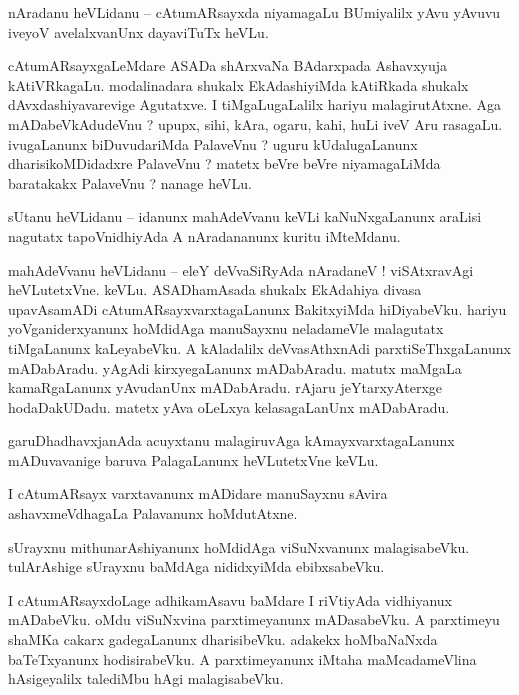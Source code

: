 \documentclass{article}
\begin{document}
\begin{mn}%
nAradanu heVLidanu -- cAtumARsayxda niyamagaLu BUmiyalilx yAvu yAvuvu iveyoV avelalxvanUnx 
dayaviTuTx heVLu.
\end{mn}

\begin{mn}%
cAtumARsayxgaLeMdare ASADa shArxvaNa BAdarxpada Ashavxyuja kAtiVRkagaLu. modalinadara shukalx 
EkAdashiyiMda kAtiRkada shukalx dAvxdashiyavarevige Agutatxve. I tiMgaLugaLalilx hariyu 
malagirutAtxne. Aga mADabeVkAdudeVnu ? upupx, sihi, kAra, ogaru, kahi, huLi iveV Aru rasagaLu. 
ivugaLanunx biDuvudariMda PalaveVnu ? uguru kUdalugaLanunx dharisikoMDidadxre PalaveVnu ? matetx 
beVre beVre niyamagaLiMda baratakakx PalaveVnu ? nanage heVLu.
\end{mn}

\begin{mn}%
sUtanu heVLidanu -- idanunx mahAdeVvanu keVLi kaNuNxgaLanunx araLisi nagutatx tapoVnidhiyAda A 
nAradananunx kuritu iMteMdanu.
\end{mn}

\begin{mn}%
mahAdeVvanu heVLidanu -- eleY deVvaSiRyAda nAradaneV  ! viSAtxravAgi heVLutetxVne. keVLu. 
ASADhamAsada shukalx EkAdahiya divasa upavAsamADi cAtumARsayxvarxtagaLanunx BakitxyiMda hiDiyabeVku. 
hariyu yoVganiderxyanunx hoMdidAga manuSayxnu neladameVle malagutatx tiMgaLanunx 
kaLeyabeVku. A kAladalilx deVvasAthxnAdi parxtiSeThxgaLanunx mADabAradu. yAgAdi kirxyegaLanunx 
mADabAradu. matutx maMgaLa kamaRgaLanunx yAvudanUnx mADabAradu. rAjaru jeYtarxyAterxge 
hodaDakUDadu. matetx yAva oLeLxya kelasagaLanUnx mADabAradu.
\end{mn}

\begin{mn}%
garuDhadhavxjanAda acuyxtanu malagiruvAga kAmayxvarxtagaLanunx mADuvavanige baruva PalagaLanunx 
heVLutetxVne keVLu.
\end{mn}

\begin{mn}%
I cAtumARsayx varxtavanunx mADidare manuSayxnu sAvira ashavxmeVdhagaLa Palavanunx hoMdutAtxne.
\end{mn}

\begin{mn}%
sUrayxnu mithunarAshiyanunx hoMdidAga viSuNxvanunx malagisabeVku. tulArAshige sUrayxnu baMdAga 
nididxyiMda ebibxsabeVku.
\end{mn}

\begin{mn}%
I cAtumARsayxdoLage adhikamAsavu baMdare I riVtiyAda vidhiyanux mADabeVku. oMdu viSuNxvina 
parxtimeyanunx mADasabeVku. A parxtimeyu shaMKa cakarx gadegaLanunx dharisibeVku. adakekx 
hoMbaNaNxda baTeTxyanunx hodisirabeVku. A parxtimeyanunx iMtaha maMcadameVlina hAsigeyalilx 
talediMbu hAgi malagisabeVku.
\end{mn}
\end{document}
